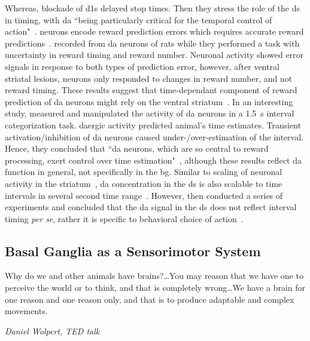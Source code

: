 Whereas, blockade of \glspl{d1} delayed stop times.
Then they stress the role of the \gls{ds} in timing, with \gls{da} ``being particularly critical for the temporal control of action"~\cite{DeCorte2019}.
 neurons encode reward prediction errors which requires accurate reward predictions~\cite[see][]{Berke2018NN}.
 recorded from \gls{da} neurons of rats while they performed a task with uncertainty in reward timing and reward number.
Neuronal activity showed error signals in response to both types of prediction error, however, after ventral striatal lesions, neurons only responded to changes in reward number, and not reward timing.
These results suggest that time-dependant component of reward prediction of \gls{da} neurons might rely on the ventral striatum~\cite{Takahashi2016}.
In an interesting study,  measured and manipulated the activity of \gls{da} neurons in a 1.5~s interval categorization task.
\Gls{da}ergic activity predicted animal's time estimates.
Transient activation/inhibition of \gls{da} neurons caused under-/over-estimation of the interval.
Hence, they concluded that ``\gls{da} neurons, which are so central to reward processing, exert control over time estimation"~\cite{Paton2016Sci}, although these results reflect \gls{da} function in general, not specifically in the \gls{bg}.
Similar to scaling of neuronal activity in the striatum~\cite{Mello2015}, \gls{da} concentration in the \gls{ds} is also scalable to time intervals in several second time range~\cite{Howard2017}.
However, \citeauthor{Howard2017} then conducted a series of experiments and concluded that the \gls{da} signal in the \gls{ds} does not reflect interval timing \textit{per se}, rather it is specific to behavioral choice of action~\cite{Howard2017}.




\subsection{Basal Ganglia as a Sensorimotor System}
\label{intro:BGMotor}
\epigraph{Why do we and other animals have brains?\ldots You may reason that we have one to perceive the world or to think, and that is completely wrong\ldots We have a brain for one reason and one reason only, and that is to produce adaptable and complex movements.}
{\textit{Daniel Wolpert, TED talk}}
\noindent

